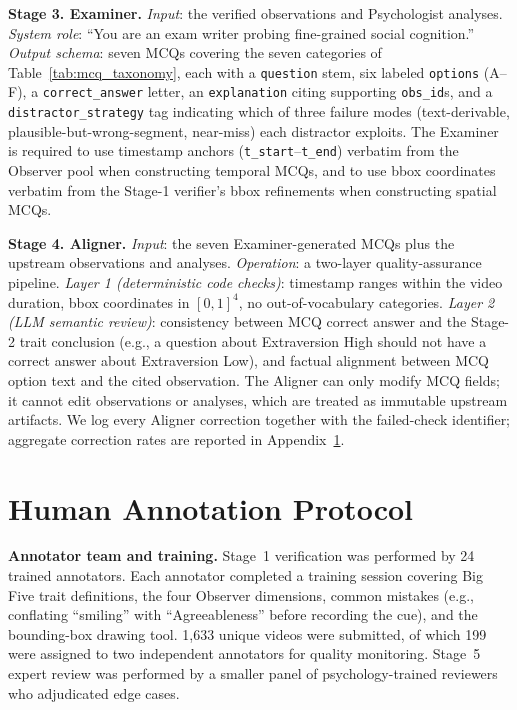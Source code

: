 \documentclass{article}
\begin{document}
\noindent\textbf{Stage 3. Examiner.}
\emph{Input}: the verified observations and Psychologist analyses.
\emph{System role}: ``You are an exam writer probing fine-grained social cognition.''
\emph{Output schema}: seven MCQs covering the seven categories of Table~\ref{tab:mcq_taxonomy}, each with a \texttt{question} stem, six labeled \texttt{options} (A--F), a \texttt{correct\_answer} letter, an \texttt{explanation} citing supporting \texttt{obs\_id}s, and a \texttt{distractor\_strategy} tag indicating which of three failure modes (text-derivable, plausible-but-wrong-segment, near-miss) each distractor exploits. The Examiner is required to use timestamp anchors (\texttt{t\_start}--\texttt{t\_end}) verbatim from the Observer pool when constructing temporal MCQs, and to use bbox coordinates verbatim from the Stage-1 verifier's bbox refinements when constructing spatial MCQs.

\noindent\textbf{Stage 4. Aligner.}
\emph{Input}: the seven Examiner-generated MCQs plus the upstream observations and analyses.
\emph{Operation}: a two-layer quality-assurance pipeline. \emph{Layer 1 (deterministic code checks)}: timestamp ranges within the video duration, bbox coordinates in $[0, 1]^4$, no out-of-vocabulary categories. \emph{Layer 2 (LLM semantic review)}: consistency between MCQ correct answer and the Stage-2 trait conclusion (e.g., a question about Extraversion High should not have a correct answer about Extraversion Low), and factual alignment between MCQ option text and the cited observation. The Aligner can only modify MCQ fields; it cannot edit observations or analyses, which are treated as immutable upstream artifacts. We log every Aligner correction together with the failed-check identifier; aggregate correction rates are reported in Appendix~\ref{app:human}.

\section{Human Annotation Protocol}
\label{app:human}

\noindent\textbf{Annotator team and training.} Stage~1 verification was performed by 24 trained annotators. Each annotator completed a training session covering Big Five trait definitions, the four Observer dimensions, common mistakes (e.g., conflating ``smiling'' with ``Agreeableness'' before recording the cue), and the bounding-box drawing tool. 1,633 unique videos were submitted, of which 199 were assigned to two independent annotators for quality monitoring. Stage~5 expert review was performed by a smaller panel of psychology-trained reviewers who adjudicated edge cases.
\end{document}

